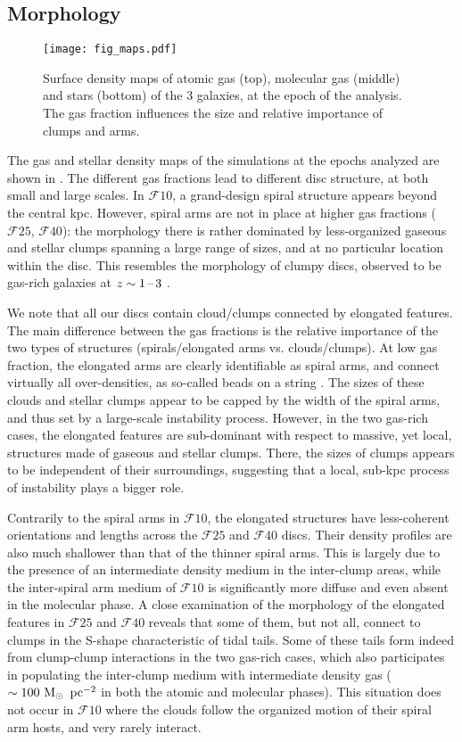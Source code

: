 \documentclass[useAMS,usenatbib]{mnras}
\newcommand{\gs}{\ensuremath{\mathcal{F}10}\xspace}
\newcommand{\gm}{\ensuremath{\mathcal{F}25}\xspace}
\newcommand{\gl}{\ensuremath{\mathcal{F}40}\xspace}
\begin{document}
\subsection{Morphology}
\label{sec:morphologies}

\begin{figure*}
\centering
\texttt{[image: fig\_maps.pdf]}
\caption{Surface density maps of atomic gas (top), molecular gas (middle) and stars (bottom) of the 3 galaxies, at the epoch of the analysis. The gas fraction influences the size and relative importance of clumps and arms.}
\label{fig:maps}
\end{figure*}

The gas and stellar density maps of the simulations at the epochs analyzed are shown in . The different gas fractions lead to different disc structure, at both small and large scales. In \gs, a grand-design spiral structure appears beyond the central kpc. However, spiral arms are not in place at higher gas fractions (\gm, \gl): the morphology there is rather dominated by less-organized gaseous and stellar clumps spanning a large range of sizes, and at no particular location within the disc. This resembles the morphology of clumpy discs, observed to be gas-rich galaxies at $z\sim 1\textrm{\,--\,} 3$ \citep[e.g.][]{Adamo2013}.

We note that all our discs contain cloud/clumps connected by elongated features. The main difference between the gas fractions is the relative importance of the two types of structures (spirals/elongated arms vs. clouds/clumps). At low gas fraction, the elongated arms are clearly identifiable as spiral arms, and connect virtually all over-densities, as so-called beads on a string \citep{Elmegreen1983, Elmegreen2019, Renaud2013b, Elmegreen2018}. The sizes of these clouds and stellar clumps appear to be capped by the width of the spiral arms, and thus set by a large-scale instability process. However, in the two gas-rich cases, the elongated features are sub-dominant with respect to massive, yet local, structures made of gaseous and stellar clumps. There, the sizes of clumps appears to be independent of their surroundings, suggesting that a local, sub-kpc process of instability plays a bigger role.

Contrarily to the spiral arms in \gs, the elongated structures have less-coherent orientations and lengths across the \gm and \gl discs. Their density profiles are also much shallower than that of the thinner spiral arms. This is largely due to the presence of an intermediate density medium in the inter-clump areas, while the inter-spiral arm medium of \gs is significantly more diffuse and even absent in the molecular phase. A close examination of the morphology of the elongated features in \gm and \gl reveals that some of them, but not all, connect to clumps in the S-shape characteristic of tidal tails. Some of these tails form indeed from clump-clump interactions in the two gas-rich cases, which also participates in populating the inter-clump medium with intermediate density gas ($\sim 100 \mathrm{~M}_{\odot}\,\mathrm{~pc}^{-2}$ in both the atomic and molecular phases). This situation does not occur in \gs where the clouds follow the organized motion of their spiral arm hosts, and very rarely interact.
\end{document}

